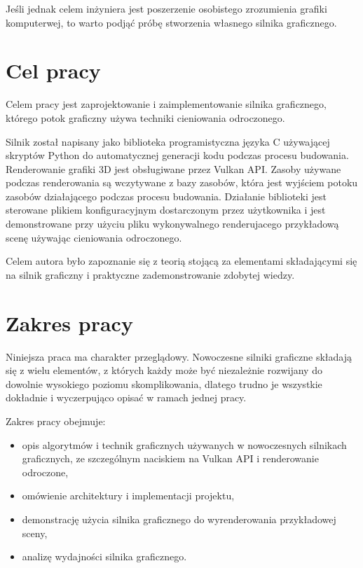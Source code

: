 Jeśli jednak celem inżyniera jest poszerzenie osobistego zrozumienia grafiki komputerwej, to warto podjąć próbę stworzenia własnego silnika graficznego.


\section{Cel pracy}

Celem pracy jest zaprojektowanie i zaimplementowanie silnika graficznego, którego potok graficzny używa techniki cieniowania odroczonego.

Silnik został napisany jako biblioteka programistyczna języka C używającej skryptów Python do automatycznej generacji kodu podczas procesu budowania.
Renderowanie grafiki 3D jest obsługiwane przez Vulkan API.
Zasoby używane podczas renderowania są wczytywane z bazy zasobów, która jest wyjściem potoku zasobów działającego podczas procesu budowania.
Działanie biblioteki jest sterowane plikiem konfiguracyjnym dostarczonym przez użytkownika i jest demonstrowane przy użyciu pliku wykonywalnego renderujacego przykładową scenę używając cieniowania odroczonego.

Celem autora było zapoznanie się z teorią stojącą za elementami składającymi się na silnik graficzny i praktyczne zademonstrowanie zdobytej wiedzy.


\section{Zakres pracy}

Niniejsza praca ma charakter przeglądowy. Nowoczesne silniki graficzne składają się z wielu elementów, z których każdy może być niezależnie rozwijany do dowolnie wysokiego poziomu skomplikowania, dlatego trudno je wszystkie dokładnie i wyczerpująco opisać w ramach jednej pracy.

Zakres pracy obejmuje:
\begin{itemize}
	\item {opis algorytmów i technik graficznych używanych w nowoczesnych silnikach graficznych, ze szczególnym naciskiem na Vulkan API i renderowanie odroczone},
	\item{omówienie architektury i implementacji projektu},
	\item{demonstrację użycia silnika graficznego do wyrenderowania przykładowej sceny},
	\item{analizę wydajności silnika graficznego}.
\end{itemize}

